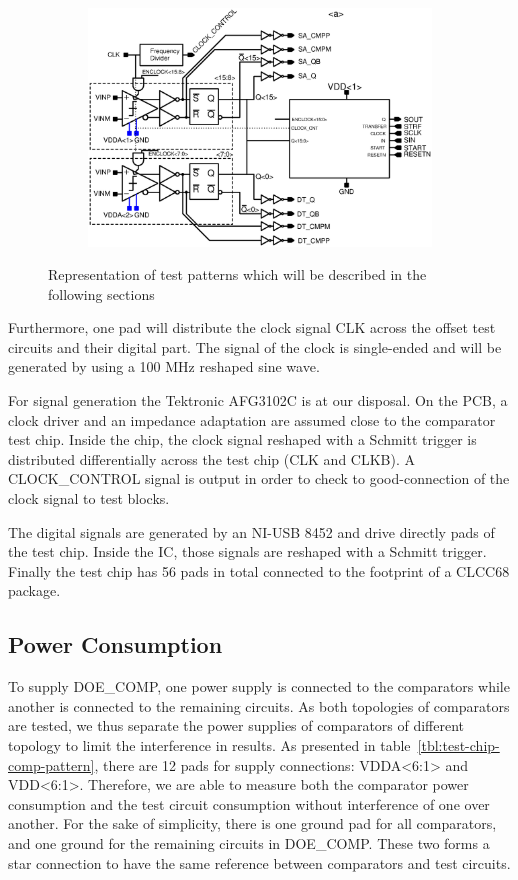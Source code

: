 \begin{figure}[htp]
\begin{subfigure}[b]{0.75\textwidth}
        \includegraphics[width=\textwidth]{Chapter5/Figs/comp_test/test_offset_conv_bloc.ps}
    \end{subfigure}
    \caption{Representation of test patterns which will be described in the following sections}
    \label{fig:test-chip-comp-patterns}
\end{figure}

Furthermore, one pad will distribute the clock signal CLK across the offset test circuits and their digital part. The signal of the clock is single-ended and will be generated by using a 100 MHz reshaped sine wave.

For signal generation the Tektronic AFG3102C is at our disposal. On the PCB, a clock driver and an impedance adaptation are assumed close to the comparator test chip. Inside the chip, the clock signal reshaped with a Schmitt trigger is distributed differentially across the test chip (CLK and CLKB). A CLOCK\_CONTROL signal is output in order to check to good-connection of the clock signal to test blocks.

The digital signals are generated by an NI-USB 8452 and drive directly pads of the test chip. Inside the IC, those signals are reshaped with a Schmitt trigger. Finally the test chip has 56 pads in total connected to the footprint of a CLCC68 package.

\subsection{Power Consumption}
To supply DOE\_COMP, one power supply is connected to the comparators while another is connected to the remaining circuits.
As both topologies of comparators are tested, we thus separate the power supplies of comparators of different topology to limit the interference in results. As presented in table~\ref{tbl:test-chip-comp-pattern}, there are 12 pads for supply connections: VDDA<6:1> and VDD<6:1>. Therefore, we are able to measure both the comparator power consumption and the test circuit consumption without interference of one over another. For the sake of simplicity, there is one ground pad for all comparators, and one ground for the remaining circuits in DOE\_COMP. These two forms a star connection to have the same reference between comparators and test circuits.

